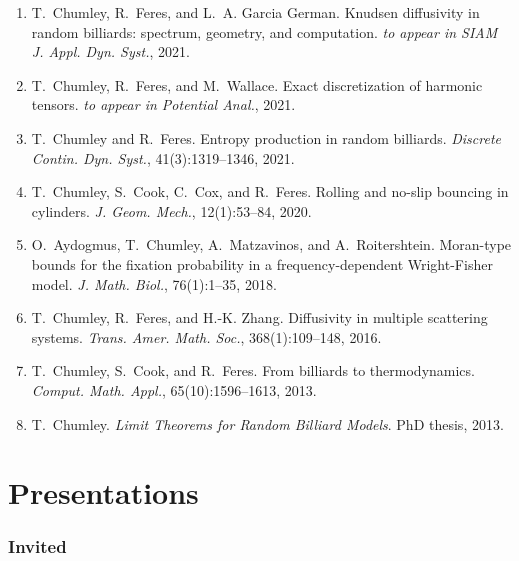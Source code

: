 \documentclass[10pt,letterpaper]{article}
\providecommand{\tightlist}{%
  \setlength{\itemsep}{0pt}\setlength{\parskip}{0pt}}
\let\tightlist\relax
\begin{document}
\begin{enumerate}
\def\labelenumi{\arabic{enumi}.}
\tightlist
\item
  \protect\hypertarget{CFG2020}{}{} T.~Chumley, R.~Feres, and L.~A.
  Garcia German. Knudsen diffusivity in random billiards: spectrum,
  geometry, and computation. \emph{to appear in SIAM J. Appl. Dyn.
  Syst.}, 2021.
\item
  \protect\hypertarget{CFW2016}{}{} T.~Chumley, R.~Feres, and
  M.~Wallace. Exact discretization of harmonic tensors. \emph{to appear
  in Potential Anal.}, 2021.
\item
  \protect\hypertarget{CF2019}{}{} T.~Chumley and R.~Feres. Entropy
  production in random billiards. \emph{Discrete Contin. Dyn. Syst.},
  41(3):1319--1346, 2021.
\item
  \protect\hypertarget{CCCF2018}{}{} T.~Chumley, S.~Cook, C.~Cox, and
  R.~Feres. Rolling and no-slip bouncing in cylinders. \emph{J. Geom.
  Mech.}, 12(1):53--84, 2020.
\item
  \protect\hypertarget{ACMR2016}{}{} O.~Aydogmus, T.~Chumley,
  A.~Matzavinos, and A.~Roitershtein. Moran-type bounds for the fixation
  probability in a frequency-dependent Wright-Fisher model. \emph{J.
  Math. Biol.}, 76(1):1--35, 2018.
\item
  \protect\hypertarget{CFZ2016}{}{} T.~Chumley, R.~Feres, and H.-K.
  Zhang. Diffusivity in multiple scattering systems. \emph{Trans. Amer.
  Math. Soc.}, 368(1):109--148, 2016.
\item
  \protect\hypertarget{CCF2013}{}{} T.~Chumley, S.~Cook, and R.~Feres.
  From billiards to thermodynamics. \emph{Comput. Math. Appl.},
  65(10):1596--1613, 2013.
\item
  \protect\hypertarget{CT}{}{} T.~Chumley. \emph{Limit Theorems for
  Random Billiard Models}. PhD thesis, 2013.
\end{enumerate}

\hypertarget{invited-presentations}{%
\section*{Presentations}\label{invited-presentations}}

\hypertarget{invited}{%
\subsubsection*{Invited}\label{invited}}
\end{document}

